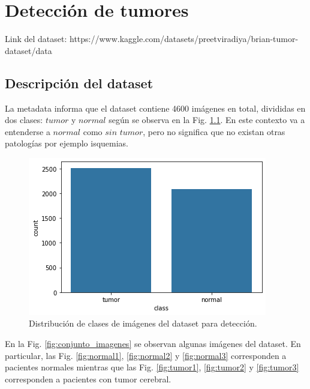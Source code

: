 
\chapter{Detección de tumores}

Link del dataset: https://www.kaggle.com/datasets/preetviradiya/brian-tumor-dataset/data

\section{Descripción del dataset}

La metadata informa que el dataset contiene 4600 imágenes en total, divididas en dos clases: $tumor$ y $normal$ según se observa en la Fig. \ref{fig.clases}. En este contexto va a entenderse a $normal$ como $sin$ $tumor$, pero no significa que no existan otras patologías por ejemplo isquemias.

\begin{figure}[H]
\centering
        \includegraphics[width=0.5\linewidth]{chapters/deteccion/images/clases.png}
        \caption{Distribución de clases de imágenes del dataset para detección.}
        \label{fig.clases}
  \end{figure}


En la Fig. \ref{fig:conjunto_imagenes} se observan algunas imágenes del dataset. En particular, las Fig. \ref{fig:normal1}, \ref{fig:normal2} y \ref{fig:normal3} corresponden a pacientes normales mientras que las Fig. \ref{fig:tumor1}, \ref{fig:tumor2} y \ref{fig:tumor3} corresponden a pacientes con tumor cerebral. 

